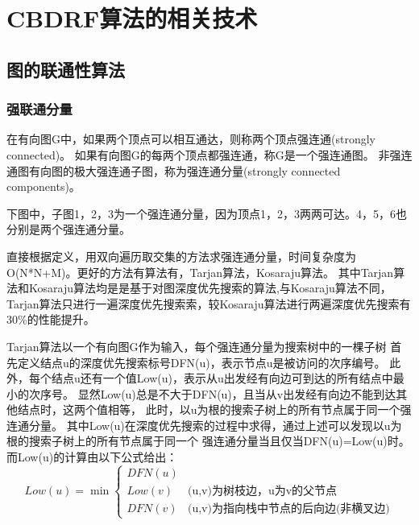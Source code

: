 \chapter{CBDRF算法的相关技术}
\label{chap:outline}
\section{图的联通性算法}
\subsection{强联通分量}
在有向图G中，如果两个顶点可以相互通达，则称两个顶点强连通(strongly connected)。
如果有向图G的每两个顶点都强连通，称G是一个强连通图。
非强连通图有向图的极大强连通子图，称为强连通分量(strongly connected components)。

下图中，子图{1，2，3}为一个强连通分量，因为顶点1，2，3两两可达。{4}，{5，6}也分别是两个强连通分量。

直接根据定义，用双向遍历取交集的方法求强连通分量，时间复杂度为O(N*N+M)。更好的方法有算法有，Tarjan算法，Kosaraju算法。
其中Tarjan算法和Kosaraju算法均是是基于对图深度优先搜索的算法,与Kosaraju算法不同，
Tarjan算法只进行一遍深度优先搜索索，较Kosaraju算法进行两遍深度优先搜索有30\%的性能提升。

Tarjan算法以一个有向图G作为输入，每个强连通分量为搜索树中的一棵子树
首先定义结点u的深度优先搜索标号DFN(u)，表示节点u是被访问的次序编号。
此外，每个结点u还有一个值Low(u)，表示从u出发经有向边可到达的所有结点中最小的次序号。
显然Low(u)总是不大于DFN(u)，且当从v出发经有向边不能到达其他结点时，这两个值相等，
此时，以u为根的搜索子树上的所有节点属于同一个强连通分量。
其中Low(u)在深度优先搜索的过程中求得，通过上述可以发现以u为根的搜索子树上的所有节点属于同一个
强连通分量当且仅当DFN(u)=Low(u)时。而Low(u)的计算由以下公式给出：
$$Low(u)=\min
\begin{cases}
DFN(u) & \\
Low(v)& \text{(u,v)为树枝边，u为v的父节点}\\
DFN(v)& \text{(u,v)为指向栈中节点的后向边(非横叉边)}
\end{cases}$$

